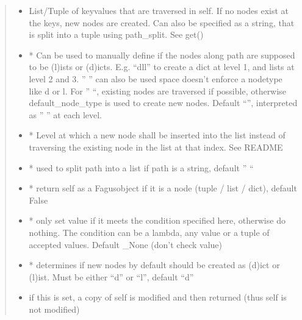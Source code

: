 \documentclass[a4paper,10pt,english]{sphinxmanual}
\begin{document}
\begin{fulllineitems}
\begin{fulllineitems}
\begin{quote}
\begin{description}
\begin{itemize}
\item {}
\sphinxAtStartPar
{} \textendash{} List/Tuple of key\sphinxhyphen{}values that are traversed in self. If no nodes exist at the keys, new nodes are
created. Can also be specified as a string, that is split into a tuple using path\_split. See get()

\item {}
\sphinxAtStartPar
{} \textendash{} * Can be used to manually define if the nodes along path are supposed to be (l)ists or
(d)icts. E.g. “dll” to create a dict at level 1, and lists at level 2 and 3. ” ” can also be used \sphinxhyphen{}
space doesn’t enforce a node\sphinxhyphen{}type like d or l. For ” “, existing nodes are traversed if possible,
otherwise default\_node\_type is used to create new nodes. Default “”, interpreted as ” ” at each level.

\item {}
\sphinxAtStartPar
{} \textendash{} * Level at which a new node shall be inserted into the list instead of traversing the
existing node in the list at that index. See README

\item {}
\sphinxAtStartPar
{} \textendash{} * used to split path into a list if path is a string, default ” “

\item {}
\sphinxAtStartPar
{} \textendash{} * return self as a Fagus\sphinxhyphen{}object if it is a node (tuple / list / dict), default False

\item {}
\sphinxAtStartPar
{} \textendash{} * only set value if it meets the condition specified here, otherwise do nothing. The condition can be
a lambda, any value or a tuple of accepted values. Default \_None (don’t check value)

\item {}
\sphinxAtStartPar
{} \textendash{} * determines if new nodes by default should be created as (d)ict or (l)ist. Must be
either “d” or “l”, default “d”

\item {}
\sphinxAtStartPar
{} \textendash{} if this is set, a copy of self is modified and then returned (thus self is not modified)


\end{itemize}
\end{description}
\end{quote}
\end{fulllineitems}
\end{fulllineitems}
\end{document}
